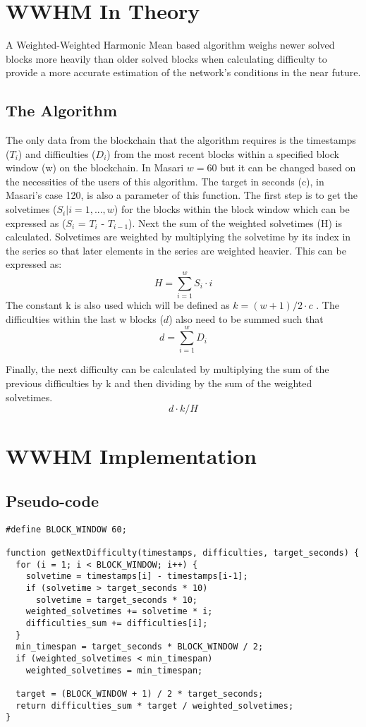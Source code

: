 \documentclass{article}
\begin{document}
\section{WWHM In Theory}
A Weighted-Weighted
Harmonic Mean based algorithm weighs
newer solved blocks more heavily than
older solved blocks when calculating
difficulty to provide a more accurate
estimation of the network's conditions in
the near future.
\subsection{The Algorithm}
The only data
from the blockchain that the algorithm
requires is the timestamps ($T_{i}$) and
difficulties ($D_{i}$) from the most recent
blocks within a specified block window (w)
on the blockchain. In Masari $w = 60$ but it can be changed based on the necessities of the users of this algorithm. The target in seconds (c), in Masari's case 120, is also a parameter of this function. The first step is to get
the solvetimes ($S_{i} | i = 1 ,...,w$) for the blocks
within the block window which can be
expressed as ($S_{i}$ = $T_{i}$ - $T_{i-1}$). Next the sum of the weighted solvetimes (H) is calculated. Solvetimes are weighted by multiplying the solvetime by its index in the series so that later elements in the series are weighted heavier. This can be expressed as: 
$$H = \sum_{i=1}^{w} S_{i}\cdot i$$
The constant k is also used which will be defined as $k = (w+1)/2\cdot c$ .
The difficulties within the last w blocks ($d$) also need to be summed such that $$d = \sum_{i=1}^{w}D_i$$

Finally, the next difficulty can be calculated by multiplying the sum of the previous difficulties by k and then dividing by the sum of the weighted solvetimes.
 $$d\cdot k / H$$
 
\section{WWHM Implementation}
\subsection{Pseudo-code}
\lstset {language=C}
\begin{lstlisting}
#define BLOCK_WINDOW 60;

function getNextDifficulty(timestamps, difficulties, target_seconds) {
  for (i = 1; i < BLOCK_WINDOW; i++) {
    solvetime = timestamps[i] - timestamps[i-1];
    if (solvetime > target_seconds * 10)
      solvetime = target_seconds * 10;
    weighted_solvetimes += solvetime * i;
    difficulties_sum += difficulties[i];
  }
  min_timespan = target_seconds * BLOCK_WINDOW / 2;
  if (weighted_solvetimes < min_timespan)
    weighted_solvetimes = min_timespan;
  
  target = (BLOCK_WINDOW + 1) / 2 * target_seconds;
  return difficulties_sum * target / weighted_solvetimes;
}

\end{lstlisting}
\end{document}
